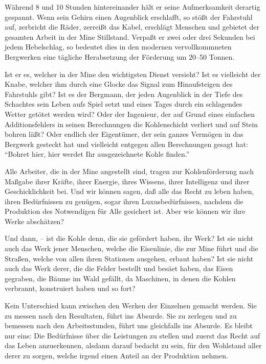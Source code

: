 \documentclass{scrbook}
\begin{document}
Während 8 und 10 Stunden hintereinander hält er seine Aufmerksamkeit derartig gespannt. Wenn sein Gehirn einen Augenblick erschlafft, so stößt der Fahrstuhl auf, zerbricht die Räder, zerreißt das Kabel, erschlägt Menschen und gebietet der gesamten Arbeit in der Mine Stillstand. Verpaßt er zwei oder drei Sekunden bei jedem Hebelschlag, so bedeutet dies in den modernen vervollkommneten Bergwerken eine tägliche Herabsetzung der Förderung um 20–50 Tonnen.

Ist er es, welcher in der Mine den wichtigsten Dienst versieht? Ist es vielleicht der Knabe, welcher ihm durch eine Glocke das Signal zum Hinaufsteigen des Fahrstuhls gibt? Ist es der Bergmann, der jeden Augenblick in der Tiefe des Schachtes sein Leben aufs Spiel setzt und eines Tages durch ein schlagendes Wetter getötet werden wird? Oder der Ingenieur, der auf Grund eines einfachen Additionsfehlers in seinen Berechnungen die Kohlenschicht verliert und auf Stein bohren läßt? Oder endlich der Eigentümer, der sein ganzes Vermögen in das Bergwerk gesteckt hat und vielleicht entgegen allen Berechnungen gesagt hat: ``Bohret hier, hier werdet Ihr ausgezeichnete Kohle finden.''

Alle Arbeiter, die in der Mine angestellt sind, tragen zur Kohlenförderung nach Maßgabe ihrer Kräfte, ihrer Energie, ihres Wissens, ihrer Intelligenz und ihrer Geschicklichkeit bei. Und wir können sagen, daß alle das Recht zu leben haben, ihren Bedürfnissen zu genügen, sogar ihren Luxusbedürfnissen, nachdem die Produktion des Notwendigen für Alle gesichert ist. Aber wie können wir ihre Werke abschätzen?

Und dann, – ist die Kohle denn, die sie gefördert haben, ihr Werk? Ist sie nicht auch das Werk jener Menschen, welche die Eisenlinie, die zur Mine führt und die Straßen, welche von allen ihren Stationen ausgehen, erbaut haben? Ist sie nicht auch das Werk derer, die die Felder bestellt und besäet haben, das Eisen gegraben, die Bäume im Wald gefällt, da Maschinen, in denen die Kohlen verbrannt, konstruiert haben und so fort?

Kein Unterschied kann zwischen den Werken der Einzelnen gemacht werden. Sie zu messen nach den Resultaten, führt ins Absurde. Sie zu zerlegen und zu bemessen nach den Arbeitsstunden, führt uns gleichfalls ins Absurde. Es bleibt nur eins: Die Bedürfnisse über die Leistungen zu stellen und zuerst das Recht auf das Leben anzuerkennen, alsdann darauf bedacht zu sein, für den Wohlstand aller derer zu sorgen, welche irgend einen Anteil an der Produktion nehmen.
\end{document}
